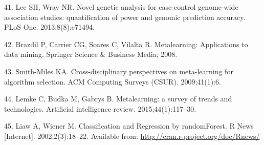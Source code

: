 \documentclass[]{article}
\begin{document}
\hypertarget{ref-Lee2013c}{}
41. Lee SH, Wray NR. Novel genetic analysis for case-control genome-wide
association studies: quantification of power and genomic prediction
accuracy. PLoS One. 2013;8(8):e71494.

\hypertarget{ref-brazdil2008metalearning}{}
42. Brazdil P, Carrier CG, Soares C, Vilalta R. Metalearning:
Applications to data mining. Springer Science \& Business Media; 2008.

\hypertarget{ref-smith2009cross}{}
43. Smith-Miles KA. Cross-disciplinary perspectives on meta-learning for
algorithm selection. ACM Computing Surveys (CSUR). 2009;41(1):6.

\hypertarget{ref-lemke2015metalearning}{}
44. Lemke C, Budka M, Gabrys B. Metalearning: a survey of trends and
technologies. Artificial intelligence review. 2015;44(1):117--30.

\hypertarget{ref-Liaw2002}{}
45. Liaw A, Wiener M. Classification and Regression by randomForest. R
News {[}Internet{]}. 2002;2(3):18--22. Available from:
\url{http://cran.r-project.org/doc/Rnews/}
\end{document}
